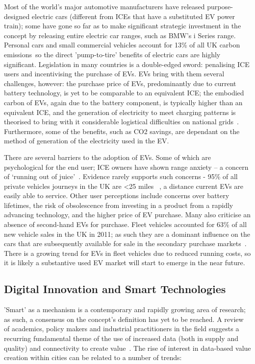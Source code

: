 \documentclass[journal]{IEEEtran}
\begin{document}
Most of the world's major automotive manufacturers have released
purpose-designed electric cars (different from ICEs that have a
substituted EV power train); some have gone so far as to make
significant strategic investment in the concept by releasing entire
electric car ranges, such as BMW's i Series range. Personal cars and
small commercial vehicles account for 13\% of all UK carbon
emissions~\cite{lumsden:2012}so the direct 'pump-to-tire' benefits of
electric cars are highly significant. Legislation in many countries is
a double-edged sword: penalising ICE users and incentivising the
purchase of EVs. EVs bring with them several challenges, however: the
purchase price of EVs, predominantly due to current battery
technology, is yet to be comparable to an equivalent ICE; the embodied
carbon of EVs, again due to the battery component, is typically higher
than an equivalent ICE, and the generation of
electricity to meet charging patterns is theorised to bring with it
considerable logistical difficulties on national
grids~\cite{su-et-al:2011,akhavan-rezai-et-al:2015}. Furthermore, some
of the benefits, such as CO2 savings, are dependant on the method of
generation of the electricity used in the EV.

There are several barriers to the adoption of EVs. Some of which are
psychological for the end user; ICE owners have shown range anxiety --
a concern of `running out of
juice'~\cite{oflev:2011,yilmaz+krein:2012}. Evidence rarely supports
such concerns - 95\% of all private vehicles journeys in the UK are
<25 miles ~\cite{oflev:2011}, a distance current EVs are easily able
to service. Other user perceptions include concerns over battery
lifetimes, the risk of obsolescence from investing in a product from a
rapidly advancing technology, and the higher price of EV purchase.
Many also criticise an absence of second-hand EVs for purchase. Fleet
vehicles accounted for 63\% of all new vehicle sales in the UK in
2011; as such they are a dominant influence on the cars that are
subsequently available for sale in the secondary purchase
markets~\cite{fleets:2012}. There is a growing trend for EVs in fleet
vehicles due to reduced running costs, so it is likely a substantive used
EV market will start to emerge in the near future.


\subsection{Digital Innovation and Smart Technologies}

'Smart' as a mechanism is a contemporary and rapidly growing area of
research; as such, a consensus on the concept's definition has yet to
be reached. A review of academics, policy makers and industrial
practitioners in the field suggests a recurring fundamental theme of
the use of increased data (both in supply and quality) and connectivity to create
value~\cite{komninos:2002,arup-et-al:2011,harrison+abbottdonnelly:2011,batty-et-al:2012,buscher:2014}. The
rise of interest in data-based value creation within cities can be
related to a number of trends:
\end{document}
